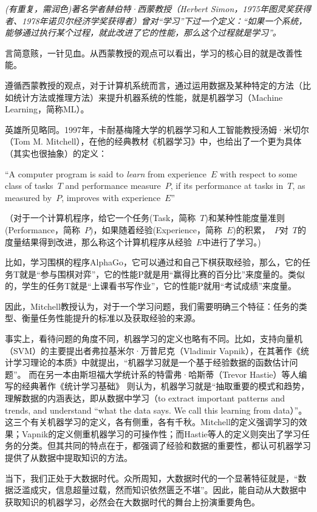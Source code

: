 {\em (有重复，需润色)著名学者赫伯特·西蒙教授（Herbert Simon，1975年图灵奖获得者、1978年诺贝尔经济学奖获得者）曾对“学习”下过一个定义：“如果一个系统，能够通过执行某个过程，就此改进了它的性能，那么这个过程就是学习”。

言简意赅，一针见血。从西蒙教授的观点可以看出，学习的核心目的就是改善性能。

遵循西蒙教授的观点，对于计算机系统而言，通过运用数据及某种特定的方法（比如统计方法或推理方法）来提升机器系统的性能，就是机器学习（Machine Learning，简称ML）。

英雄所见略同。1997年，卡耐基梅隆大学的机器学习和人工智能教授汤姆·米切尔（Tom M. Mitchell），在他的经典教材《机器学习》\cite{mitchell2002}中，也给出了一个更为具体（其实也很抽象）的定义：

“A computer program is said to {\em learn} from experience~$ E$ with respect to some class of tasks~$T$ and performance measure~$P$, if its performance at tasks in~$T$, as measured by~$P$, improves with experience~$E$”

（对于一个计算机程序，给它一个任务(Task，简称~$T$)和某种性能度量准则(Performance，简称~$P$)，如果随着经验(Experience，简称~$E$)的积累，~$P$对~$T$的度量结果得到改进，那么称这个计算机程序从经验~$E$中进行了学习。)

比如，学习围棋的程序AlphaGo，它可以通过和自己下棋获取经验，那么，它的任务T就是“参与围棋对弈”，它的性能P就是用“赢得比赛的百分比”来度量的。类似的，学生的任务T就是“上课看书写作业”，它的性能P就用“考试成绩”来度量。

因此，Mitchell教授认为，对于一个学习问题，我们需要明确三个特征：任务的类型、衡量任务性能提升的标准以及获取经验的来源。

事实上，看待问题的角度不同，机器学习的定义也略有不同。比如，支持向量机（SVM）的主要提出者弗拉基米尔·万普尼克（Vladimir Vapnik），在其著作《统计学习理论的本质》\cite{vladimir2000}中就提出，“机器学习就是一个基于经验数据的函数估计问题”。
而在另一本由斯坦福大学统计系的特雷弗·哈斯蒂（Trevor Hastie）等人编写的经典著作《统计学习基础》\cite{hastie2015} 则认为，机器学习就是“抽取重要的模式和趋势，理解数据的内涵表达，即从数据中学习（to extract important patterns and trends, and understand “what the data says. We call this learning from data）”。
这三个有关机器学习的定义，各有侧重，各有千秋。Mitchell的定义强调学习的效果；Vapnik的定义侧重机器学习的可操作性；而Hastie等人的定义则突出了学习任务的分类。但其共同的特点在于，都强调了经验和数据的重要性，都认可机器学习提供了从数据中提取知识的方法。

当下，我们正处于大数据时代。众所周知，大数据时代的一个显著特征就是，“数据泛滥成灾，信息超量过载，然而知识依然匮乏不堪”。因此，能自动从大数据中获取知识的机器学习，必然会在大数据时代的舞台上扮演重要角色。}

